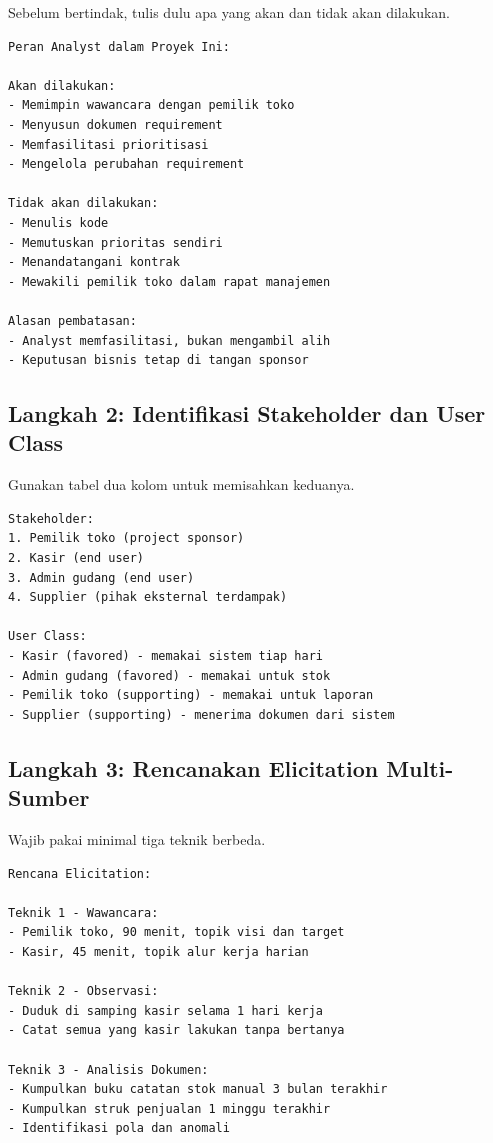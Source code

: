 \documentclass[11pt,a4paper]{article}
\begin{document}
Sebelum bertindak, tulis dulu apa yang akan dan tidak akan dilakukan.

\begin{lstlisting}[style=out]
Peran Analyst dalam Proyek Ini:

Akan dilakukan:
- Memimpin wawancara dengan pemilik toko
- Menyusun dokumen requirement
- Memfasilitasi prioritisasi
- Mengelola perubahan requirement

Tidak akan dilakukan:
- Menulis kode
- Memutuskan prioritas sendiri
- Menandatangani kontrak
- Mewakili pemilik toko dalam rapat manajemen

Alasan pembatasan:
- Analyst memfasilitasi, bukan mengambil alih
- Keputusan bisnis tetap di tangan sponsor
\end{lstlisting}

\subsection{Langkah 2: Identifikasi Stakeholder dan User Class}

Gunakan tabel dua kolom untuk memisahkan keduanya.

\begin{lstlisting}[style=out]
Stakeholder:
1. Pemilik toko (project sponsor)
2. Kasir (end user)
3. Admin gudang (end user)
4. Supplier (pihak eksternal terdampak)

User Class:
- Kasir (favored) - memakai sistem tiap hari
- Admin gudang (favored) - memakai untuk stok
- Pemilik toko (supporting) - memakai untuk laporan
- Supplier (supporting) - menerima dokumen dari sistem
\end{lstlisting}

\subsection{Langkah 3: Rencanakan Elicitation Multi-Sumber}

Wajib pakai minimal tiga teknik berbeda.

\begin{lstlisting}[style=out]
Rencana Elicitation:

Teknik 1 - Wawancara:
- Pemilik toko, 90 menit, topik visi dan target
- Kasir, 45 menit, topik alur kerja harian

Teknik 2 - Observasi:
- Duduk di samping kasir selama 1 hari kerja
- Catat semua yang kasir lakukan tanpa bertanya

Teknik 3 - Analisis Dokumen:
- Kumpulkan buku catatan stok manual 3 bulan terakhir
- Kumpulkan struk penjualan 1 minggu terakhir
- Identifikasi pola dan anomali
\end{lstlisting}
\end{document}
